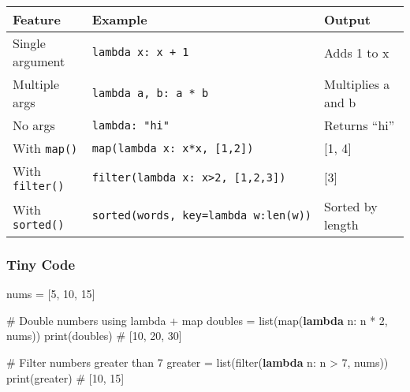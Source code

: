 \documentclass[
  letterpaper,
  DIV=11,
  numbers=noendperiod]{scrreprt}
\newenvironment{Shaded}{\begin{snugshade}}{\end{snugshade}}
\newcommand{\BuiltInTok}[1]{\textcolor[rgb]{0.00,0.23,0.31}{#1}}
\newcommand{\CommentTok}[1]{\textcolor[rgb]{0.37,0.37,0.37}{#1}}
\newcommand{\DecValTok}[1]{\textcolor[rgb]{0.68,0.00,0.00}{#1}}
\newcommand{\KeywordTok}[1]{\textcolor[rgb]{0.00,0.23,0.31}{\textbf{#1}}}
\newcommand{\NormalTok}[1]{\textcolor[rgb]{0.00,0.23,0.31}{#1}}
\newcommand{\OperatorTok}[1]{\textcolor[rgb]{0.37,0.37,0.37}{#1}}
\begin{document}
\begin{longtable}[]{@{}
  >{\raggedright\arraybackslash}p{}
  >{\raggedright\arraybackslash}p{}
  >{\raggedright\arraybackslash}p{}@{}}
\toprule\noalign{}
\begin{minipage}[b]{\linewidth}\raggedright
Feature
\end{minipage} & \begin{minipage}[b]{\linewidth}\raggedright
Example
\end{minipage} & \begin{minipage}[b]{\linewidth}\raggedright
Output
\end{minipage} \\
\midrule\noalign{}
\endhead
\bottomrule\noalign{}
\endlastfoot
Single argument & \texttt{lambda\ x:\ x\ +\ 1} & Adds 1 to x \\
Multiple args & \texttt{lambda\ a,\ b:\ a\ *\ b} & Multiplies a and b \\
No args & \texttt{lambda:\ "hi"} & Returns ``hi'' \\
With \texttt{map()} & \texttt{map(lambda\ x:\ x*x,\ {[}1,2{]})} & {[}1,
4{]} \\
With \texttt{filter()} &
\texttt{filter(lambda\ x:\ x\textgreater{}2,\ {[}1,2,3{]})} & {[}3{]} \\
With \texttt{sorted()} & \texttt{sorted(words,\ key=lambda\ w:len(w))} &
Sorted by length \\
\end{longtable}

\subsubsection{Tiny Code}\label{tiny-code-36}

\begin{Shaded}
\begin{Highlighting}[]
\NormalTok{nums }\OperatorTok{=}\NormalTok{ [}\DecValTok{5}\NormalTok{, }\DecValTok{10}\NormalTok{, }\DecValTok{15}\NormalTok{]}

\CommentTok{\# Double numbers using lambda + map}
\NormalTok{doubles }\OperatorTok{=} \BuiltInTok{list}\NormalTok{(}\BuiltInTok{map}\NormalTok{(}\KeywordTok{lambda}\NormalTok{ n: n }\OperatorTok{*} \DecValTok{2}\NormalTok{, nums))}
\BuiltInTok{print}\NormalTok{(doubles)   }\CommentTok{\# [10, 20, 30]}

\CommentTok{\# Filter numbers greater than 7}
\NormalTok{greater }\OperatorTok{=} \BuiltInTok{list}\NormalTok{(}\BuiltInTok{filter}\NormalTok{(}\KeywordTok{lambda}\NormalTok{ n: n }\OperatorTok{\textgreater{}} \DecValTok{7}\NormalTok{, nums))}
\BuiltInTok{print}\NormalTok{(greater)   }\CommentTok{\# [10, 15]}
\end{Highlighting}
\end{Shaded}
\end{document}

